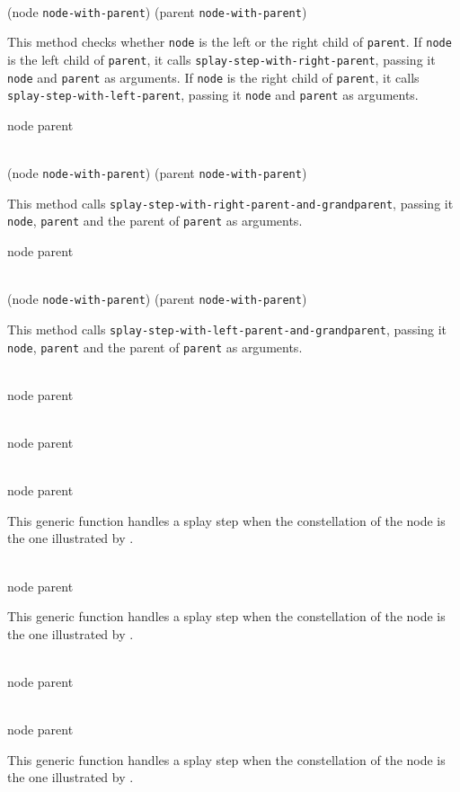 \\
{(node \texttt{node-with-parent}) (parent \texttt{node-with-parent})}

This method checks whether \texttt{node} is the left or the right child
of \texttt{parent}.  If \texttt{node} is the left child of
\texttt{parent}, it calls \texttt{splay-step-with-right-parent},
passing it \texttt{node} and \texttt{parent} as arguments.  If
\texttt{node} is the right child of \texttt{parent}, it calls
\texttt{splay-step-with-left-parent}, passing it \texttt{node} and
\texttt{parent} as arguments.

 {node parent}

\\
{(node \texttt{node-with-parent}) (parent \texttt{node-with-parent})}

This method calls \texttt{splay-step-with-right-parent-and-grandparent},
passing it \texttt{node}, \texttt{parent} and the parent of
\texttt{parent} as arguments.

 {node parent}

\\
{(node \texttt{node-with-parent}) (parent \texttt{node-with-parent})}

This method calls \texttt{splay-step-with-left-parent-and-grandparent},
passing it \texttt{node}, \texttt{parent} and the parent of
\texttt{parent} as arguments.

\\
{node parent}

\\
{node parent}

\\
{node parent}

This generic function handles a splay step when the constellation of
the node is the one illustrated by .

\\
{node parent}

This generic function handles a splay step when the constellation of
the node is the one illustrated by .

\\
{node parent}

\\
{node parent}

This generic function handles a splay step when the constellation of
the node is the one illustrated by .
